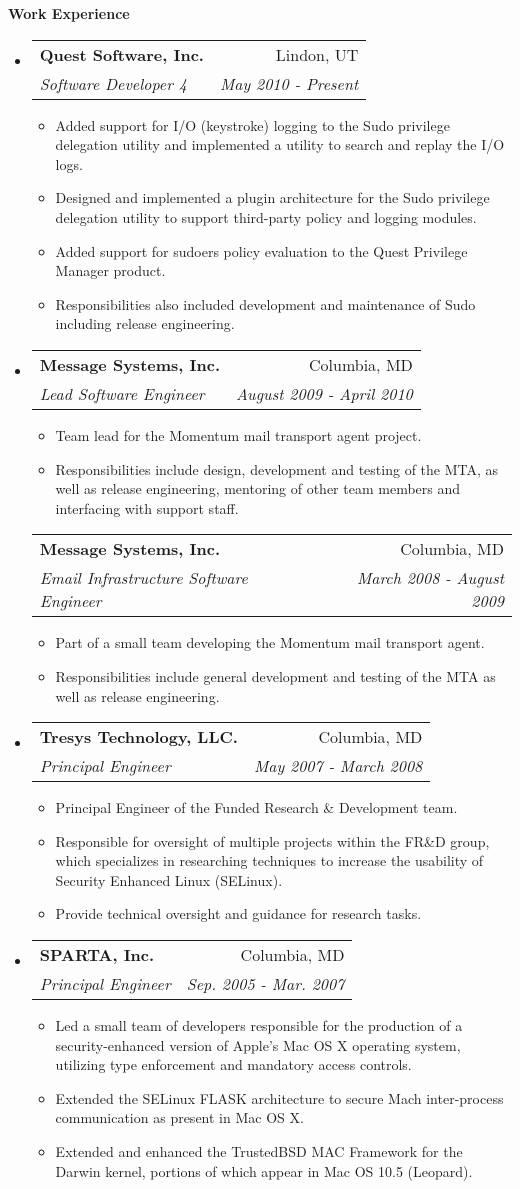\documentclass[letterpaper,11pt]{article}
\makeatletter
\newcommand{\resitem}[1]{\item #1 \vspace{-2pt}}
\newcommand{\resheading}[1]{{\large \colorbox{mygrey}{\begin{minipage}{\textwidth}{\textbf{#1 \vphantom{p\^{E}}}}\end{minipage}}}}
\newcommand{\ressubheading}[4]{
\begin{tabular*}{7.0in}{l@{\extracolsep{\fill}}r}
		\textbf{#1} & #2 \\
		\textit{#3} & \textit{#4} \\
\end{tabular*}\vspace{-6pt}}
\makeatother
\begin{document}
\resheading{Work Experience}
\begin{itemize}
\item
	\ressubheading{Quest Software, Inc.}{Lindon, UT}{Software Developer 4}{May 2010 - Present}
	\begin{itemize}
		\resitem{Added support for I/O (keystroke) logging to the Sudo privilege delegation utility and implemented a utility to search and replay the I/O logs.}
		\resitem{Designed and implemented a plugin architecture for the Sudo privilege delegation utility to support third-party policy and logging modules.}
		\resitem{Added support for sudoers policy evaluation to the Quest Privilege Manager product.}
		\resitem{Responsibilities also included development and maintenance of Sudo including release engineering.}
	\end{itemize}
\item
	\ressubheading{Message Systems, Inc.}{Columbia, MD}{Lead Software Engineer}{August 2009 - April 2010}
	\begin{itemize}
		\resitem{Team lead for the Momentum mail transport agent project.}
		\resitem{Responsibilities include design, development and testing of the MTA, as well as release engineering, mentoring of other team members and interfacing with support staff.}
	\end{itemize}
	\ressubheading{Message Systems, Inc.}{Columbia, MD}{Email Infrastructure Software Engineer}{March 2008 - August 2009}
	\begin{itemize}
		\resitem{Part of a small team developing the Momentum mail transport agent.}
		\resitem{Responsibilities include general development and testing of the MTA as well as release engineering.}
	\end{itemize}

\item
	\ressubheading{Tresys Technology, LLC.}{Columbia, MD}{Principal Engineer}{May 2007 - March 2008}
	\begin{itemize}
		\resitem{Principal Engineer of the Funded Research \& Development team.}
		\resitem{Responsible for oversight of multiple projects within the FR\&D group, which specializes in researching techniques to increase the usability of Security Enhanced Linux (SELinux).}
		\resitem{Provide technical oversight and guidance for research tasks.}
	\end{itemize}

\item
	\ressubheading{SPARTA, Inc.}{Columbia, MD}{Principal Engineer}{Sep. 2005 - Mar. 2007}
	\begin{itemize}
		\resitem{Led a small team of developers responsible for the production of a security-enhanced version of Apple's Mac OS X operating system, utilizing type enforcement and mandatory access controls.}
		\resitem{Extended the SELinux FLASK architecture to secure Mach inter-process communication as present in Mac OS X.}
		\resitem{Extended and enhanced the TrustedBSD MAC Framework for the Darwin kernel, portions of which appear in Mac OS 10.5 (Leopard).}
	\end{itemize}


\end{itemize}
\end{document}

